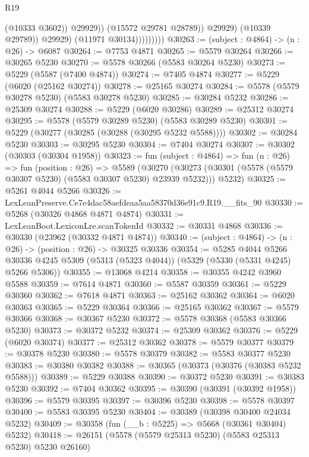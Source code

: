 \begin{lexlean}{R19}
\begin{coremodule}
                                  (@10333 @3602))
                                @29929))
                            (@15572 @29781 @28789))
                          @29929)
                        (@10339 @29789))
                      @29929)
                    (@11971 @30134)))))))))
@30263 := (subject : @4864) -> (n : @26) -> @6087
@30264 := @7753 @4871
@30265 := @5579 @30264
@30266 := @30265 @5230
@30270 := @5578 @30266 (@5583 @30264 @5230)
@30273 := @5229 (@5587 (@7400 @4874))
@30274 := @7405 @4874
@30277 := @5229 (@6020 (@25162 @30274))
@30278 := @25165 @30274
@30284 := @5578 (@5579 @30278 @5230) (@5583 @30278 @5230)
@30285 := @30284 @5232
@30286 := @25309 @30274
@30288 := @5229 (@6020 @30286)
@30289 := @25312 @30274
@30295 := @5578 (@5579 @30289 @5230) (@5583 @30289 @5230)
@30301 := @5229 (@30277 (@30285 (@30288 (@30295 @5232 @5588))))
@30302 := @30284 @5230
@30303 := @30295 @5230
@30304 := @7404 @30274
@30307 := @30302 (@30303 (@30304 @1958))
@30323 := fun (subject : @4864) =>
  fun (n : @26) =>
  fun (position : @26) =>
  @5589
    (@30270 (@30273 (@30301 (@5578 (@5579 @30307 @5230) (@5583 @30307 @5230) @23939 @5232))) @5232)
@30325 := @5261 @4044 @5266
@30326 := LexLeanPreserve.Ce7e4dac58aefdeaa5aa58370d36e91c9.R19.__fits_90
@30330 := @5268 (@30326 @4868 @4871 @4874)
@30331 := LexLeanBoot.LexiconLre.scanTokenId
@30332 := @30331 @4868
@30336 := @30330 (@23962 (@30332 @4871 @4874))
@30340 := (subject : @4864) -> (n : @26) -> (position : @26) -> @30325 @30336
@30354 := @5285
    @4044
    @5266
    @30336
    @4245
    @5309
    (@5313 (@5323 @4044))
    (@5329 (@5330 (@5331 @4245) @5266 @5306))
@30355 := @13068 @4214
@30358 := @30355 @4242 @3960 @5588
@30359 := @7614 @4871
@30360 := @5587 @30359
@30361 := @5229 @30360
@30362 := @7618 @4871
@30363 := @25162 @30362
@30364 := @6020 @30363
@30365 := @5229 @30364
@30366 := @25165 @30362
@30367 := @5579 @30366
@30368 := @30367 @5230
@30372 := @5578 @30368 (@5583 @30366 @5230)
@30373 := @30372 @5232
@30374 := @25309 @30362
@30376 := @5229 (@6020 @30374)
@30377 := @25312 @30362
@30378 := @5579 @30377
@30379 := @30378 @5230
@30380 := @5578 @30379
@30382 := @5583 @30377 @5230
@30383 := @30380 @30382
@30388 := @30365 (@30373 (@30376 (@30383 @5232 @5588)))
@30389 := @5229 @30388
@30390 := @30372 @5230
@30391 := @30383 @5230
@30392 := @7404 @30362
@30395 := @30390 (@30391 (@30392 @1958))
@30396 := @5579 @30395
@30397 := @30396 @5230
@30398 := @5578 @30397
@30400 := @5583 @30395 @5230
@30404 := @30389 (@30398 @30400 @24034 @5232)
@30409 := @30358 (fun (__b : @5225) => @5668 (@30361 @30404) @5232)
@30418 := @26151 (@5578 (@5579 @25313 @5230) (@5583 @25313 @5230) @5230 @26160)

\end{coremodule}
\end{lexlean}

